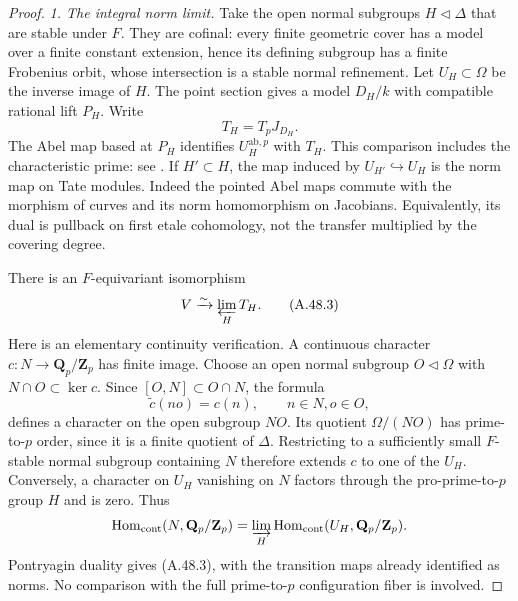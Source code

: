 \documentclass[11pt]{article}
\begin{document}
\begin{proof}
\emph{1. The integral norm limit.}
Take the open normal subgroups $H\triangleleft\Delta$
that are stable under $F$. They are cofinal: every
finite geometric cover has a model over a finite
constant extension, hence its defining subgroup has
a finite Frobenius orbit, whose intersection is a
stable normal refinement. Let $U_H\subset\Omega$
be the inverse image of $H$. The point section
gives a model $D_H/k$ with compatible rational lift
$P_H$. Write
\[
                    T_H=T_pJ_{D_H}.
\]
The Abel map based at $P_H$ identifies
$U_H^{\mathrm{ab},p}$ with $T_H$. This comparison
includes the characteristic prime: see
\cite[Proposition~9.1, Lemmas~9.4--9.5 and
Corollary~9.6]{AC_MilneJac1986}.
If $H'\subset H$, the map induced by
$U_{H'}\hookrightarrow U_H$ is the norm map on
Tate modules. Indeed the pointed Abel maps commute
with the morphism of curves and its norm homomorphism
on Jacobians. Equivalently, its dual is pullback on
first etale cohomology, not the transfer multiplied
by the covering degree.

There is an $F$-equivariant isomorphism
\[
                 V\xrightarrow{\sim}\varprojlim_H T_H.
                                                        \tag{A.48.3}
\]
Here is an elementary continuity verification. A
continuous character $c:N\to\mathbf Q_p/\mathbf Z_p$
has finite image. Choose an open normal subgroup
$O\triangleleft\Omega$ with $N\cap O\subset\ker c$.
Since $[O,N]\subset O\cap N$, the formula
\[
               \widetilde c(no)=c(n),\qquad n\in N, o\in O,
\]
defines a character on the open subgroup $NO$.
Its quotient $\Omega/(NO)$ has prime-to-$p$ order,
since it is a finite quotient of $\Delta$.
Restricting to a sufficiently small $F$-stable normal
subgroup containing $N$ therefore extends $c$ to
one of the $U_H$. Conversely, a character on $U_H$
vanishing on $N$ factors through the pro-prime-to-$p$
group $H$ and is zero. Thus
\[
 \operatorname{Hom}_{\mathrm{cont}}(N,\mathbf Q_p/\mathbf Z_p)
  =\varinjlim_H
    \operatorname{Hom}_{\mathrm{cont}}(U_H,\mathbf Q_p/\mathbf Z_p).
\]
Pontryagin duality gives (A.48.3), with the transition
maps already identified as norms. No comparison with
the full prime-to-$p$ configuration fiber is involved.


\end{proof}
\end{document}
